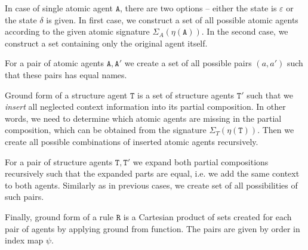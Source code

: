 \documentclass[12pt]{fithesis2}
\begin{document}
In case of single atomic agent $\mathtt{A}$, there are two options -- either the state is $\varepsilon$ or the state $\delta$ is given. In first case, we construct a set of all possible atomic agents according to the given atomic signature $\Sigma_A(\eta(\mathtt{A}))$. In the second case, we construct a set containing only the original agent itself.

For a pair of atomic agents $\mathtt{A}, \mathtt{A}'$ we create a set of all possible pairs $(a, a')$ such that these pairs has equal names.

Ground form of a structure agent $\mathtt{T}$ is a set of structure agents $\mathtt{T}'$ such that we \emph{insert} all neglected context information into its partial composition. In other words, we need to determine which atomic agents are missing in the partial composition, which can be obtained from the signature $\Sigma_T(\eta(\mathtt{T}))$. Then we create all possible combinations of inserted atomic agents recursively.

For a pair of structure agents $\mathtt{T}, \mathtt{T}'$ we expand both partial compositions recursively such that the expanded parts are equal, i.e. we add the same context to both agents. Similarly as in previous cases, we create set of all possibilities of such pairs.

Finally, ground form of a rule $\mathtt{R}$ is a Cartesian product of sets created for each pair of agents by applying ground from function. The pairs are given by order in index map $\psi$.
\end{document}
